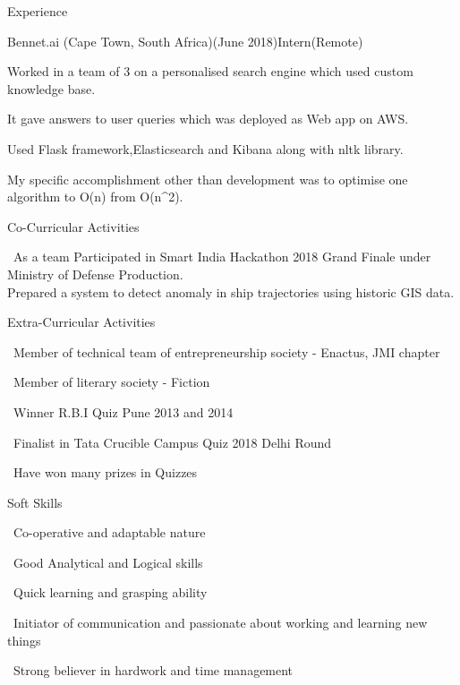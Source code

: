 \documentclass{resume} %
\begin{document}

\begin{rSection}{Experience}

\begin{rSubsection}{Bennet.ai (Cape Town, South Africa)}{(June 2018)}{Intern(Remote)}{}
	\item Worked in a team of 3 on a personalised search engine which used custom knowledge base.
	\item It gave answers to user queries which was deployed as Web app on AWS.
	\item Used Flask framework,Elasticsearch and Kibana along with nltk library.
	\item My specific accomplishment other than development was to optimise one algorithm to O(n) from O(n^2).\\
\end{rSubsection}
\end{rSection}


\begin{rSection}{Co-Curricular Activities} \itemsep -2pt
\item \textbullet \ As a team Participated in Smart India Hackathon 2018 Grand Finale under Ministry of Defense Production. \\Prepared a system to detect anomaly in ship trajectories using historic GIS data.
\end{rSection}

\begin{rSection}{Extra-Curricular Activities} \itemsep -3pt
  \item \textbullet \ Member of technical team of entrepreneurship society - Enactus, JMI chapter
  \item \textbullet \ Member of literary society - Fiction
	\item \textbullet \ Winner R.B.I Quiz Pune 2013 and 2014
	\item \textbullet \ Finalist in Tata Crucible Campus Quiz 2018 Delhi Round
	\item \textbullet \ Have won many prizes in Quizzes
\end{rSection}

\begin{rSection}{Soft Skills}
  \itemsep -3pt
 \item \textbullet \ Co-operative and adaptable nature
 \item \textbullet \ Good Analytical and Logical skills
 \item \textbullet \ Quick learning and grasping ability 
 \item \textbullet \ Initiator of communication and passionate about working and learning new things 
 \item \textbullet \ Strong believer in hardwork and time management
\end{rSection}
\end{document}
